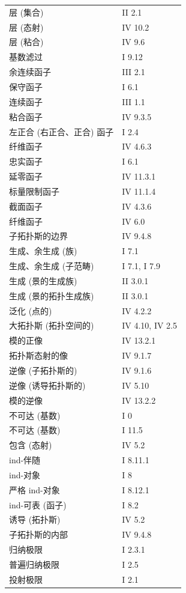 \begin{longtable}{@{}p{.68\linewidth}p{.27\linewidth}@{}}
层 (集合) & II 2.1\\
层 (态射) & IV 10.2\\
层 (粘合) & IV 9.6\\
基数滤过 & I 9.12\\
余连续函子 & III 2.1\\
保守函子 & I 6.1\\
连续函子 & III 1.1\\
粘合函子 & IV 9.3.5\\
左正合 (右正合、正合) 函子 & I 2.4\\
纤维函子 & IV 4.6.3\\
忠实函子 & I 6.1\\
延零函子 & IV 11.3.1\\
标量限制函子 & IV 11.1.4\\
截面函子 & IV 4.3.6\\
纤维函子 & IV 6.0\\
子拓扑斯的边界 & IV 9.4.8\\[.7em]
生成、余生成 (族) & I 7.1\\
生成、余生成 (子范畴) & I 7.1, I 7.9\\
生成 (景的生成族) & II 3.0.1\\
生成 (景的拓扑生成族) & II 3.0.1\\
泛化 (点的) & IV 4.2.2\\
大拓扑斯 (拓扑空间的) & IV 4.10, IV 2.5\\[.7em]
模的正像 & IV 13.2.1\\
拓扑斯态射的像 & IV 9.1.7\\
逆像 (子拓扑斯的) & IV 9.1.6\\
逆像 (诱导拓扑斯的) & IV 5.10\\
模的逆像 & IV 13.2.2\\
不可达 (基数) & I 0\\
不可达 (基数) & I 11.5\\
包含 (态射) & IV 5.2\\
ind-伴随 & I 8.11.1\\
ind-对象 & I 8\\
严格 ind-对象 & I 8.12.1\\
ind-可表 (函子) & I 8.2\\
诱导 (拓扑斯) & IV 5.2\\
子拓扑斯的内部 & IV 9.4.8\\[.7em]
归纳极限 & I 2.3.1\\
普遍归纳极限 & I 2.5\\
投射极限 & I 2.1\\

\end{longtable}
